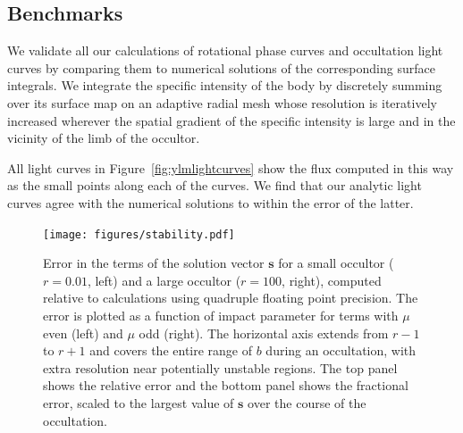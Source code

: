 \documentclass[modern]{aastex61}
\begin{document}
\subsection{Benchmarks}
\label{sec:starrybenchmarks}

We validate all our calculations of rotational phase curves and occultation
light curves by comparing them to numerical solutions of the corresponding
surface integrals. We integrate the specific intensity of the body by
discretely summing over its surface map on an adaptive radial mesh whose
resolution is iteratively increased wherever the spatial gradient of the
%
%
specific intensity is large and in the vicinity of the limb of the occultor.

%
%

All light curves in Figure~\ref{fig:ylmlightcurves} show the flux computed
in this way as the small points along each of the curves. We find that our
analytic light curves agree with the numerical solutions to within the error
of the latter.

\begin{figure}[p!]
    \begin{centering}
    \texttt{[image: figures/stability.pdf]}
    \caption{\label{fig:stability}
             Error in the terms of the solution vector $\mathbf{s}$ for a small
             occultor ($r = 0.01$, left) and a large occultor ($r = 100$, right),
             computed relative to calculations using quadruple
             floating point precision. The error is plotted as a function of impact parameter
             for terms with $\mu$ even (left)
             and $\mu$ odd (right). The horizontal axis extends from $r - 1$ to $r + 1$ and covers
             the entire range of $b$ during an occultation, with extra resolution near
             potentially unstable regions. The top panel shows the relative error
             and the bottom panel shows the fractional error, scaled to the largest value
             of $\mathbf{s}$ over the course of the occultation.
             }
    \end{centering}
\end{figure}
\end{document}
